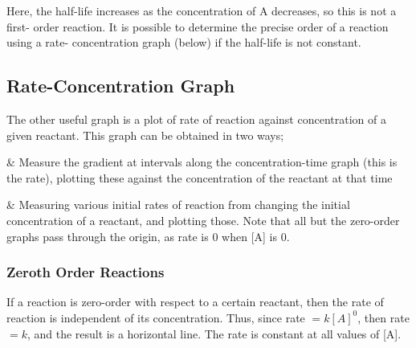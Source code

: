 				Here, the half-life increases as the concentration of A decreases, so this is not a first- order reaction. It is possible to
				determine the precise order of a reaction using a rate- concentration graph (below) if the half-life is not constant.






		\pagebreak
		\subsection{Rate-Concentration Graph}

			The other useful graph is a plot of rate of reaction against concentration of a given reactant. This graph can be
			obtained in two ways;

			\begin{bulletlist}
				& Measure the gradient at intervals along the concentration-time graph (this is the rate), plotting these against the
				concentration of the reactant at that time

				& Measuring various initial rates of reaction from changing the initial concentration of a reactant, and plotting those.
				Note that all but the zero-order graphs pass through the origin, as rate is 0 when [A] is 0.
			\end{bulletlist}


			\subsubsection{Zeroth Order Reactions}

				If a reaction is zero-order with respect to a certain reactant, then the rate of reaction is independent of its concentration.
				Thus, since rate $= k[A]^{0}$, then rate $= k$, and the result is a horizontal line. The rate is constant at all values of [A].


				\begin{center}
				\end{center}


